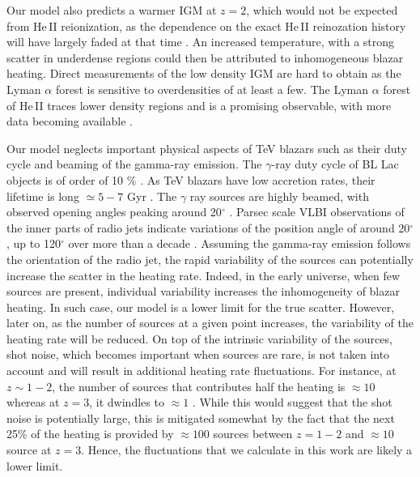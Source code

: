 \documentclass[numberedappendix]{emulateapj}
\begin{document}
Our model also predicts a warmer IGM at $z=2$, which would not be expected from He\,\textsc{II} reionization, as the dependence on the exact He\,\textsc{II} reinozation history will have largely faded at that time \citep{2013MNRAS.435.3169C}. An increased temperature, with a strong scatter in underdense regions could then be attributed to inhomogeneous blazar heating. Direct measurements of the low density IGM are hard to obtain as the Lyman $\alpha$ forest is sensitive to overdensities of at least a few. The Lyman $\alpha$ forest of He\,\textsc{II} traces lower density regions and is a promising observable, with more data becoming available \citep{2014arXiv1405.7405W}.


Our model neglects important physical aspects of TeV blazars such as their duty cycle and beaming of the gamma-ray emission. The $\gamma$-ray duty cycle of BL Lac objects is of order of 10 $\%$ \citep{1996ApJ...464..600S}. As TeV blazars have low accretion rates, their lifetime is long $\simeq 5-7$ Gyr \citep{2002ApJ...571..226C}. The $\gamma$ ray sources are highly beamed, with observed opening angles peaking around 20$^{\circ}$ \citep{2009A&A...507L..33P}. Parsec scale VLBI observations of the inner parts of radio jets indicate variations of the position angle of around 20$^{\circ}$, up to 120$^{\circ}$ over more than a decade \citep{2013AJ....146..120L}. Assuming the gamma-ray emission follows the orientation of the radio jet, the rapid variability of the sources can potentially increase the scatter in the heating rate. Indeed, in the early universe, when few sources are present,  individual variability increases the inhomogeneity of blazar heating. In such case, our model is a lower limit for the true scatter. However, later on, as the number of sources at a  given point increases, the variability of the heating rate will be reduced.    On top of the intrinsic  variability  of the sources, shot noise, which becomes important when sources are rare, is not taken into account and will result in additional heating rate fluctuations. For instance, at $z \sim 1-2$, the number of sources that contributes half the heating is $\approx 10$ whereas at $z = 3$, it dwindles to $\approx 1$ \citep{2012ApJ...752...23C}.   While this would suggest that the shot noise is potentially large, this is mitigated somewhat by the fact that the next 25\% of the heating is provided by $\approx 100$ sources between $z=1-2$ and $\approx 10$ source at $z=3$. Hence, the fluctuations that we calculate in this work are likely a lower limit.
\end{document}
